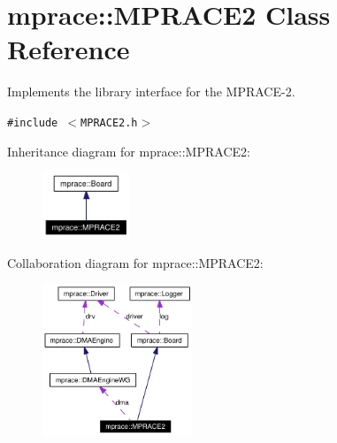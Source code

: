\hypertarget{classmprace_1_1MPRACE2}{
\section{mprace::MPRACE2 Class Reference}
\label{classmprace_1_1MPRACE2}
}
Implements the library interface for the MPRACE-2.  


{\tt \#include $<$MPRACE2.h$>$}

Inheritance diagram for mprace::MPRACE2:\begin{figure}[H]
\begin{center}
\leavevmode
\includegraphics[width=74pt]{classmprace_1_1MPRACE2__inherit__graph}
\end{center}
\end{figure}
Collaboration diagram for mprace::MPRACE2:\begin{figure}[H]
\begin{center}
\leavevmode
\includegraphics[width=127pt]{classmprace_1_1MPRACE2__coll__graph}
\end{center}
\end{figure}

